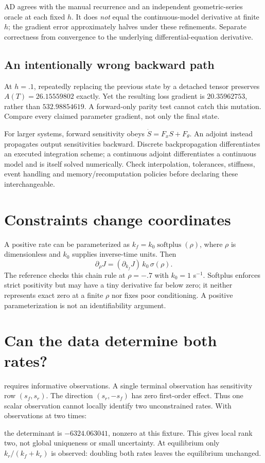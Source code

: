 \begin{center}\end{center}
AD agrees with the manual recurrence and an independent geometric-series oracle
at each fixed $h$. It does \emph{not} equal the continuous-model derivative at
finite $h$; the gradient error approximately halves under these refinements.
Separate  correctness from convergence to the underlying
differential-equation derivative.

\subsection{An intentionally wrong backward path}
At $h=.1$, repeatedly replacing the previous state by a detached tensor preserves
$A(T)=26.15559802$ exactly. Yet the resulting loss gradient is $20.35962753$,
rather than $532.98854619$. A forward-only parity test cannot catch this mutation.
Compare every claimed parameter gradient, not only the final state.

For larger systems, forward sensitivity obeys
$\dot S=F_xS+F_\theta$. An adjoint instead propagates output sensitivities backward.
Discrete backpropagation differentiates an executed integration scheme;
a continuous adjoint differentiates a continuous model and is itself solved
numerically. Check interpolation, tolerances, stiffness, event handling and
memory/recomputation policies before declaring these interchangeable.

\section{Constraints change coordinates}
A positive rate can be parameterized as $k_f=k_0\operatorname{softplus}(\rho)$,
where $\rho$ is dimensionless and $k_0$ supplies inverse-time units. Then
\[
 \partial_\rho J=(\partial_{k_f}J)\,k_0\,\sigma(\rho).
\]
The reference checks this chain rule at $\rho=-.7$ with $k_0=1$ s$^{-1}$.
Softplus enforces strict positivity but may have a tiny derivative far below zero;
it neither represents exact zero at a finite $\rho$ nor fixes poor conditioning.
A positive parameterization is not an identifiability argument.

\section{Can the data determine both rates?}
 requires informative observations.
A single terminal observation has sensitivity row $(s_f,s_r)$. The direction
$(s_r,-s_f)$ has zero first-order effect. Thus one scalar observation cannot
locally identify two unconstrained rates. With observations at two times:
\begin{center}\end{center}
the determinant is $-6324.063041$, nonzero at this fixture.
This gives local rank two, not global uniqueness or small uncertainty.
At equilibrium only $k_r/(k_f+k_r)$ is observed: doubling both rates leaves
the equilibrium unchanged.

